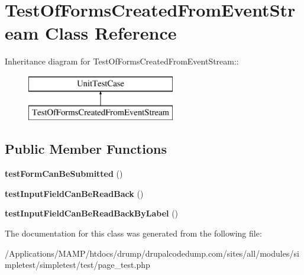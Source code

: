\hypertarget{class_test_of_forms_created_from_event_stream}{
\section{TestOfFormsCreatedFromEventStream Class Reference}
\label{class_test_of_forms_created_from_event_stream}
}
Inheritance diagram for TestOfFormsCreatedFromEventStream::\begin{figure}[H]
\begin{center}
\leavevmode
\includegraphics[height=2cm]{class_test_of_forms_created_from_event_stream}
\end{center}
\end{figure}
\subsection*{Public Member Functions}
\begin{DoxyCompactItemize}
\item 
\hypertarget{class_test_of_forms_created_from_event_stream_a6517aba7da66b31de72fed60e4f9435e}{
{\bfseries testFormCanBeSubmitted} ()}
\label{class_test_of_forms_created_from_event_stream_a6517aba7da66b31de72fed60e4f9435e}

\item 
\hypertarget{class_test_of_forms_created_from_event_stream_ae8edd17be254f111413ccb222c40fa12}{
{\bfseries testInputFieldCanBeReadBack} ()}
\label{class_test_of_forms_created_from_event_stream_ae8edd17be254f111413ccb222c40fa12}

\item 
\hypertarget{class_test_of_forms_created_from_event_stream_af1bac191992c0a49388bc1d5f2b55cc9}{
{\bfseries testInputFieldCanBeReadBackByLabel} ()}
\label{class_test_of_forms_created_from_event_stream_af1bac191992c0a49388bc1d5f2b55cc9}

\end{DoxyCompactItemize}


The documentation for this class was generated from the following file:\begin{DoxyCompactItemize}
\item 
/Applications/MAMP/htdocs/drump/drupalcodedump.com/sites/all/modules/simpletest/simpletest/test/page\_\-test.php\end{DoxyCompactItemize}

